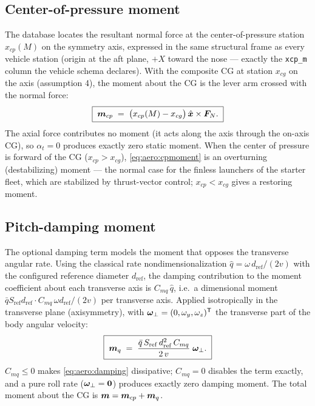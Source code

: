 \subsection{Center-of-pressure moment}

The database locates the resultant normal force at the
center-of-pressure station $x_{cp}(M)$ on the symmetry axis, expressed in
the same structural frame as every vehicle station (origin at the aft
plane, $+X$ toward the nose --- exactly the \texttt{xcp\_m} column the
vehicle schema declares). With the composite CG at station $x_{cg}$ on
the axis (assumption 4), the moment about the CG is the lever arm crossed
with the normal force:
\begin{equation}
  \boxed{\;
  \bm{m}_{cp} \;=\; \bigl( x_{cp}(M) - x_{cg} \bigr)\, \hat{\bm{x}}
    \times \bm{F}_N .
  \;}
  \label{eq:aero:cpmoment}
\end{equation}
The axial force contributes no moment (it acts along the axis through the
on-axis CG), so $\alpha_t = 0$ produces exactly zero static moment. When
the center of pressure is forward of the CG ($x_{cp} > x_{cg}$),
\eqref{eq:aero:cpmoment} is an overturning (destabilizing) moment --- the
normal case for the finless launchers of the starter fleet, which are
stabilized by thrust-vector control; $x_{cp} < x_{cg}$ gives a restoring
moment.

\subsection{Pitch-damping moment}

The optional damping term models the moment that opposes the transverse
angular rate. Using the classical rate nondimensionalization
$\hat{q} = \omega\, d_{\mathrm{ref}} / (2 v)$ with the configured
reference diameter $d_{\mathrm{ref}}$, the damping contribution to the
moment coefficient about each transverse axis is
$C_{mq}\,\hat{q}$, i.e.\ a dimensional moment
$\bar{q} S_{\mathrm{ref}} d_{\mathrm{ref}} \cdot C_{mq}\,
\omega d_{\mathrm{ref}}/(2v)$ per transverse axis. Applied isotropically
in the transverse plane (axisymmetry), with
$\bm{\omega}_\perp = (0, \omega_y, \omega_z)^{\mathsf T}$ the transverse
part of the body angular velocity:
\begin{equation}
  \boxed{\;
  \bm{m}_q \;=\; \frac{\bar{q}\, S_{\mathrm{ref}}\,
    d_{\mathrm{ref}}^2\, C_{mq}}{2\, v}\; \bm{\omega}_\perp .
  \;}
  \label{eq:aero:damping}
\end{equation}
$C_{mq} \le 0$ makes \eqref{eq:aero:damping} dissipative; $C_{mq} = 0$
disables the term exactly, and a pure roll rate
($\bm{\omega}_\perp = \bm{0}$) produces exactly zero damping moment. The
total moment about the CG is $\bm{m} = \bm{m}_{cp} + \bm{m}_q$.

